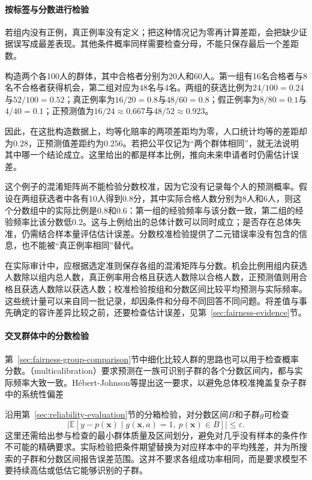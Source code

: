 \paragraph{按标签与分数进行检验}

若组内没有正例，真正例率没有定义；把这种情况记为零再计算差距，会把缺少证据误写成最差表现。其他条件概率同样需要检查分母，不能只保存最后一个差距数。

\begin{example}[同一批申请者上的不同公平指标]
\label{ex:fairness-rates}
构造两个各100人的群体，其中合格者分别为20人和60人。第一组有16名合格者与8名不合格者获得机会，第二组对应为48名与4名。两组的获选比例为$24/100=0.24$与$52/100=0.52$；真正例率为$16/20=0.8$与$48/60=0.8$；假正例率为$8/80=0.1$与$4/40=0.1$；正预测值为$16/24\approx0.667$与$48/52\approx0.923$。

因此，在这批构造数据上，均等化赔率的两项差距均为零，人口统计均等的差距却为$0.28$，正预测值差距约为$0.256$。若把公平仅记为“两个群体相同”，就无法说明其中哪一个结论成立。这里给出的都是样本比例，推向未来申请者时仍需估计误差。
\end{example}

这个例子的混淆矩阵尚不能检验分数校准，因为它没有记录每个人的预测概率。假设在两组获选者中各有10人得到$0.8$分，其中实际合格人数分别为8人和6人，则这个分数组中的实际比例是$0.8$和$0.6$：第一组的经验频率与该分数一致，第二组的经验频率比该分数低$0.2$。这与上例给出的总体计数可以同时成立；是否存在总体失准，仍需结合样本量评估估计误差。分数校准检验提供了二元错误率没有包含的信息，也不能被“真正例率相同”替代。

在实际审计中，应根据选定准则保存各组的混淆矩阵与分数。机会比例用组内获选人数除以组内总人数，真正例率用合格且获选人数除以合格人数，正预测值则用合格且获选人数除以获选人数；校准检验按组和分数区间比较平均预测与实际频率。这些统计量可以来自同一批记录，却因条件和分母不同回答不同问题。将差值与事先确定的容许差异比较之前，还要检查估计误差，见第~\ref{sec:fairness-evidence}节。

\paragraph{交叉群体中的分数检验}

第~\ref{sec:fairness-group-comparison}节中细化比较人群的思路也可以用于检查概率分数。（multicalibration）要求预测在一族可识别子群的各个分数区间内，都与实际频率大致一致。Hébert-Johnson等提出这一要求，以避免总体校准掩盖复杂子群中的系统性偏差

沿用第~\ref{sec:reliability-evaluation}节的分箱检验，对分数区间$B$和子群$g$可检查
\begin{equation}
 \left|\mathbb E[y-p(\bm{x})\mid
       g(\bm{x},a)=1,\ p(\bm{x})\in B]\right|
 \leq\varepsilon.
 \label{eq:fairness-multicalibration}
\end{equation}
这里还需给出参与检查的最小群体质量及区间划分，避免对几乎没有样本的条件作不可能的精确要求。实际检验把条件期望替换为对应样本中的平均残差，并为所搜索的子群和分数区间报告误差范围。这并不要求各组成功率相同，而是要求模型不要持续高估或低估它能够识别的子群。

